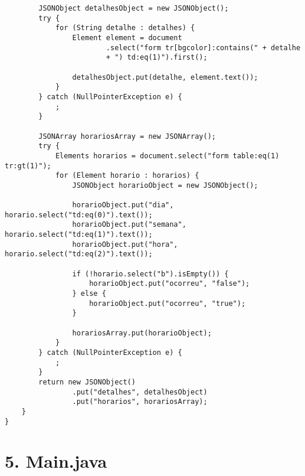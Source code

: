 \begin{lstlisting}
        JSONObject detalhesObject = new JSONObject();
        try {
            for (String detalhe : detalhes) {
                Element element = document
                        .select("form tr[bgcolor]:contains(" + detalhe
                        + ") td:eq(1)").first();

                detalhesObject.put(detalhe, element.text());
            }
        } catch (NullPointerException e) {
            ;
        }

        JSONArray horariosArray = new JSONArray();
        try {
            Elements horarios = document.select("form table:eq(1) tr:gt(1)");
            for (Element horario : horarios) {
                JSONObject horarioObject = new JSONObject();

                horarioObject.put("dia", horario.select("td:eq(0)").text());
                horarioObject.put("semana", horario.select("td:eq(1)").text());
                horarioObject.put("hora", horario.select("td:eq(2)").text());

                if (!horario.select("b").isEmpty()) {
                    horarioObject.put("ocorreu", "false");
                } else {
                    horarioObject.put("ocorreu", "true");
                }

                horariosArray.put(horarioObject);
            }
        } catch (NullPointerException e) {
            ;
        }
        return new JSONObject()
                .put("detalhes", detalhesObject)
                .put("horarios", horariosArray);
    }
}
\end{lstlisting}

\section*{5. Main.java}


